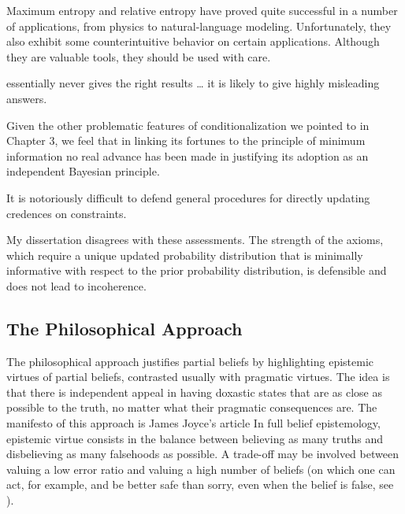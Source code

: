 \documentclass[phd,12pt,oneside]{ubcthesis}
\begin{document}
\begin{quotex}
  Maximum entropy and relative entropy have proved quite successful in
  a number of applications, from physics to natural-language modeling.
  Unfortunately, they also exhibit some counterintuitive behavior on
  certain applications. Although they are valuable tools, they should
  be used with care. 
\end{quotex}

\begin{quotex}
   essentially never gives the right results {\ldots} it
  is likely to give highly misleading answers.
\end{quotex}

\begin{quotex}
  Given the other problematic features of conditionalization we
  pointed to in Chapter 3, we feel that in linking its fortunes to the
  principle of minimum information no real advance has been made in
  justifying its adoption as an independent Bayesian principle.
\end{quotex}

\begin{quotex}
  It is notoriously difficult to defend general procedures for
  directly updating credences on constraints. 
\end{quotex}

My dissertation disagrees with these assessments. The strength of the
axioms, which require a unique updated probability distribution that
is minimally informative with respect to the prior probability
distribution, is defensible and does not lead to incoherence.

\subsection{The Philosophical Approach}
\label{subsec:upuxaith}

The philosophical approach justifies partial beliefs by highlighting
epistemic virtues of partial beliefs, contrasted usually with
pragmatic virtues. The idea is that there is independent appeal in
having doxastic states that are as close as possible to the truth, no
matter what their pragmatic consequences are. The manifesto of this
approach is James Joyce's article  In full belief epistemology, epistemic virtue consists
in the balance between believing as many truths and disbelieving as
many falsehoods as possible. A trade-off may be involved between
valuing a low error ratio and valuing a high number of beliefs (on
which one can act, for example, and be better safe than sorry, even
when the belief is false, see ). 
\end{document}
